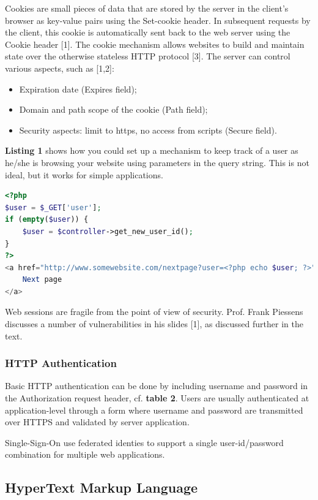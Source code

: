 Cookies are small pieces of data that are stored by the server in the client's browser as key-value pairs using the Set-cookie header. In subsequent requests by the client, this cookie is automatically sent back to the web server using the Cookie header [1]. The cookie mechanism allows websites to build and maintain state over the otherwise stateless HTTP protocol [3]. The server can control various aspects, such as [1,2]:
\begin{itemize}
	\item Expiration date (Expires field);
	\item Domain and path scope of the cookie (Path field);
	\item Security aspects: limit to https, no access from scripts (Secure field).
\end{itemize}

\textbf{Listing 1} shows how you could set up a mechanism to keep track of a user as he/she is browsing your website using parameters in the query string. This is not ideal, but it works for simple applications.

\begin{lstlisting}[language=php, caption=Example of how state can be maintained using URLs and PHP., label=listing:]
<?php
$user = $_GET['user'];
if (empty($user)) {
	$user = $controller->get_new_user_id();
}
?>
<a href="http://www.somewebsite.com/nextpage?user=<?php echo $user; ?>">
	Next page
</a>
\end{lstlisting}


Web sessions are fragile from the point of view of security. Prof. Frank Piessens discusses a number of vulnerabilities in his slides [1], as discussed further in the text.


\subsubsection{HTTP Authentication}

Basic HTTP authentication can be done by including username and password in the Authorization request header, cf. \textbf{table 2}. Users are usually authenticated at application-level through a form where username and password are transmitted over HTTPS and validated by server application.

Single-Sign-On use federated identies to support a single user-id/password combination for multiple web applications.



\subsection{HyperText Markup Language}

